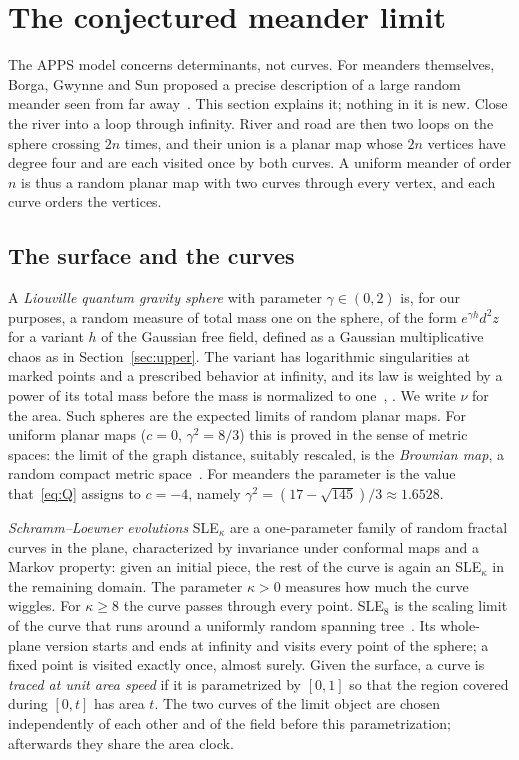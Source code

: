 \section{The conjectured meander limit}\label{sec:limit}

The APPS model concerns determinants, not curves. For meanders themselves, Borga, Gwynne and Sun
proposed a precise description of a large random meander seen from far away~\cite{BGS}. This
section explains it; nothing in it is new. Close the river into a loop through infinity. River and
road are then two loops on the sphere crossing $2n$ times, and their union is a planar map whose
$2n$ vertices have degree four and are each visited once by both curves. A uniform meander of order
$n$ is thus a random planar map with two curves through every vertex, and each curve orders the
vertices.

\subsection{The surface and the curves}

A \emph{Liouville quantum gravity sphere} with parameter $\gamma\in(0,2)$ is, for our purposes, a
random measure of total mass one on the sphere, of the form $e^{\gamma h}d^2z$ for a variant $h$ of the Gaussian free
field, defined as a Gaussian multiplicative chaos as in Section~\ref{sec:upper}. The variant has
logarithmic singularities at marked points and a prescribed behavior at infinity, and its law is
weighted by a power of its total mass before the mass is normalized to one~\cite{DMS},
\cite[Section~2]{BGS}. We write $\nu$ for the area. Such spheres are the expected limits of random
planar maps. For uniform planar maps ($c=0$, $\gamma^2=8/3$) this is proved in the sense of metric
spaces: the limit of the graph distance, suitably rescaled, is the \emph{Brownian map}, a random
compact metric space~\cite{LeGall,Miermont}. For meanders the parameter is the value that~\eqref{eq:Q} assigns to
$c=-4$, namely $\gamma^2=(17-\sqrt{145})/3\approx1.6528$.

\emph{Schramm--Loewner evolutions} SLE$_\kappa$ are a one-parameter family of random fractal
curves in the plane, characterized by invariance under conformal maps and a Markov property: given
an initial piece, the rest of the curve is again an SLE$_\kappa$ in the remaining domain. The
parameter $\kappa>0$ measures how much the curve wiggles. For $\kappa\ge8$ the curve passes through
every point. SLE$_8$ is the scaling limit of the curve that runs around a uniformly
random spanning tree~\cite{LSWust}. Its whole-plane version starts and ends at infinity and visits
every point of the sphere; a fixed point is visited exactly once, almost surely. Given the surface,
a curve is \emph{traced at unit area speed} if it is parametrized by $[0,1]$ so that the region
covered during $[0,t]$ has area $t$. The two curves of the limit object are chosen independently of
each other and of the field before this parametrization; afterwards they share the area clock.

